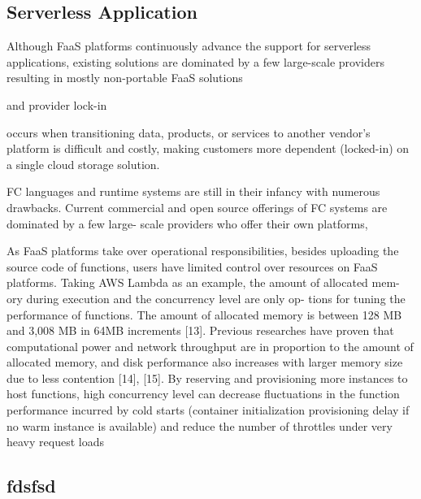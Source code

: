 \documentclass[12pt,a4paper]{report}
\begin{document}
 


















\subsection{Serverless Application}



Although FaaS platforms continuously advance the support for serverless applications, existing solutions are dominated by a few large-scale providers resulting in mostly non-portable FaaS solutions 

and provider lock-in

occurs when transitioning data, products, or services to another vendor's platform is difficult and costly, making customers more dependent (locked-in) on a single cloud storage solution.

FC languages and runtime systems are still in their
infancy with numerous drawbacks. Current commercial and open
source offerings of FC systems are dominated by a few large-
scale providers who offer their own platforms, 

As FaaS platforms take over operational responsibilities,
besides uploading the source code of functions, users have
limited control over resources on FaaS platforms. Taking
AWS Lambda as an example, the amount of allocated mem-
ory during execution and the concurrency level are only op-
tions for tuning the performance of functions. The amount
of allocated memory is between 128 MB and 3,008 MB
in 64MB increments [13]. Previous researches have proven
that computational power and network throughput are in
proportion to the amount of allocated memory, and disk
performance also increases with larger memory size due
to less contention [14], [15]. By reserving and provisioning
more instances to host functions, high concurrency level can
decrease ﬂuctuations in the function performance incurred
by cold starts (container initialization provisioning delay if
no warm instance is available) and reduce the number of
throttles under very heavy request loads



\subsection{fdsfsd}
\end{document}

